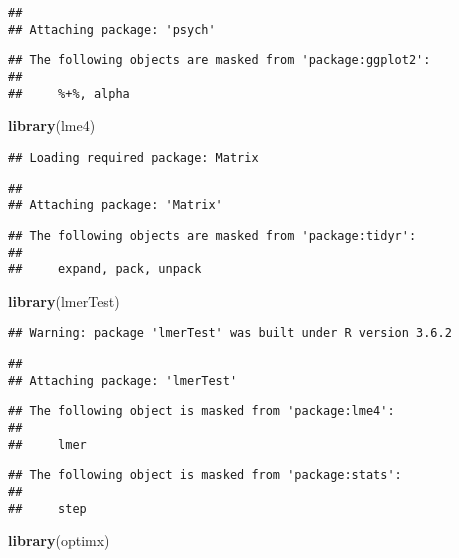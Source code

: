 \documentclass[
]{article}
\newenvironment{Shaded}{\begin{snugshade}}{\end{snugshade}}
\newcommand{\KeywordTok}[1]{\textcolor[rgb]{0.13,0.29,0.53}{\textbf{#1}}}
\newcommand{\NormalTok}[1]{#1}
\begin{document}
\begin{verbatim}
## 
## Attaching package: 'psych'
\end{verbatim}

\begin{verbatim}
## The following objects are masked from 'package:ggplot2':
## 
##     %+%, alpha
\end{verbatim}

\begin{Shaded}
\begin{Highlighting}[]
\KeywordTok{library}\NormalTok{(lme4)}
\end{Highlighting}
\end{Shaded}

\begin{verbatim}
## Loading required package: Matrix
\end{verbatim}

\begin{verbatim}
## 
## Attaching package: 'Matrix'
\end{verbatim}

\begin{verbatim}
## The following objects are masked from 'package:tidyr':
## 
##     expand, pack, unpack
\end{verbatim}

\begin{Shaded}
\begin{Highlighting}[]
\KeywordTok{library}\NormalTok{(lmerTest)}
\end{Highlighting}
\end{Shaded}

\begin{verbatim}
## Warning: package 'lmerTest' was built under R version 3.6.2
\end{verbatim}

\begin{verbatim}
## 
## Attaching package: 'lmerTest'
\end{verbatim}

\begin{verbatim}
## The following object is masked from 'package:lme4':
## 
##     lmer
\end{verbatim}

\begin{verbatim}
## The following object is masked from 'package:stats':
## 
##     step
\end{verbatim}

\begin{Shaded}
\begin{Highlighting}[]
\KeywordTok{library}\NormalTok{(optimx)}
\end{Highlighting}
\end{Shaded}
\end{document}
